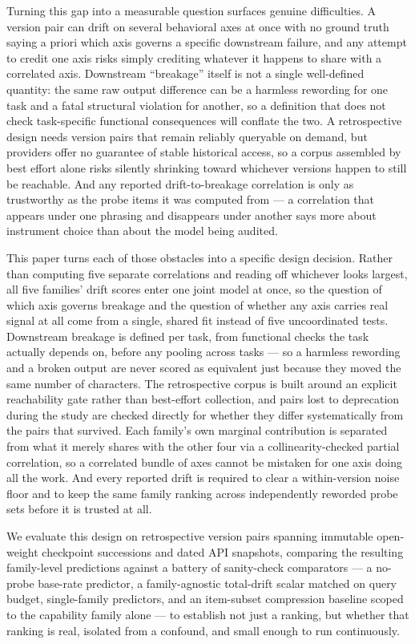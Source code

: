 \documentclass[11pt]{article}
\begin{document}
Turning this gap into a measurable question surfaces genuine difficulties. A version pair can drift on several behavioral axes at once with no ground truth saying a priori which axis governs a specific downstream failure, and any attempt to credit one axis risks simply crediting whatever it happens to share with a correlated axis. Downstream ``breakage'' itself is not a single well-defined quantity: the same raw output difference can be a harmless rewording for one task and a fatal structural violation for another, so a definition that does not check task-specific functional consequences will conflate the two. A retrospective design needs version pairs that remain reliably queryable on demand, but providers offer no guarantee of stable historical access, so a corpus assembled by best effort alone risks silently shrinking toward whichever versions happen to still be reachable. And any reported drift-to-breakage correlation is only as trustworthy as the probe items it was computed from --- a correlation that appears under one phrasing and disappears under another says more about instrument choice than about the model being audited.

This paper turns each of those obstacles into a specific design decision. Rather than computing five separate correlations and reading off whichever looks largest, all five families' drift scores enter one joint model at once, so the question of which axis governs breakage and the question of whether any axis carries real signal at all come from a single, shared fit instead of five uncoordinated tests. Downstream breakage is defined per task, from functional checks the task actually depends on, before any pooling across tasks --- so a harmless rewording and a broken output are never scored as equivalent just because they moved the same number of characters. The retrospective corpus is built around an explicit reachability gate rather than best-effort collection, and pairs lost to deprecation during the study are checked directly for whether they differ systematically from the pairs that survived. Each family's own marginal contribution is separated from what it merely shares with the other four via a collinearity-checked partial correlation, so a correlated bundle of axes cannot be mistaken for one axis doing all the work. And every reported drift is required to clear a within-version noise floor and to keep the same family ranking across independently reworded probe sets before it is trusted at all.

We evaluate this design on retrospective version pairs spanning immutable open-weight checkpoint successions and dated API snapshots, comparing the resulting family-level predictions against a battery of sanity-check comparators --- a no-probe base-rate predictor, a family-agnostic total-drift scalar matched on query budget, single-family predictors, and an item-subset compression baseline scoped to the capability family alone --- to establish not just a ranking, but whether that ranking is real, isolated from a confound, and small enough to run continuously.
\end{document}
